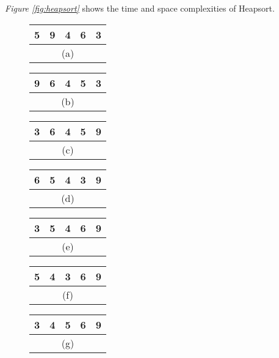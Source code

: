 \textit{Figure \ref{fig:heapsort}} shows the time and space complexities of Heapsort.

\begin{figure}[!ht]
    \centering
    \begin{tabular}{|c|c|c|c|c|}
    \hline
    5 & 9 & 4 & 6 & 3 \\
    \hline
    \multicolumn{5}{c}{(a)} \\
    \end{tabular}
    \quad\quad\quad
    \begin{tabular}{|c|c|c|c|c|}
    \hline
    9 & 6 & 4 & 5 & 3 \\
    \hline
    \multicolumn{5}{c}{(b)} \\
    \end{tabular}
    \break
    \begin{tabular}{|c|c|c|c|c|}
    \hline
    3 & 6 & 4 & 5 & \cellcolor{lightgray}9 \\
    \hline
    \multicolumn{5}{c}{(c)} \\
    \end{tabular}
    \quad\quad\quad
    \begin{tabular}{|c|c|c|c|c|}
    \hline
    6 & 5 & 4 & 3 & \cellcolor{lightgray}9 \\
    \hline
    \multicolumn{5}{c}{(d)} \\
    \end{tabular}
    \break
    \begin{tabular}{|c|c|c|c|c|}
    \hline
    3 & 5 & 4 & \cellcolor{lightgray}6 & \cellcolor{lightgray}9 \\
    \hline
    \multicolumn{5}{c}{(e)} \\
    \end{tabular}
    \quad\quad\quad
    \begin{tabular}{|c|c|c|c|c|}
    \hline
    5 & 4 & 3 & \cellcolor{lightgray}6 & \cellcolor{lightgray}9 \\
    \hline
    \multicolumn{5}{c}{(f)} \\
    \end{tabular}
    \break
    \begin{tabular}{|c|c|c|c|c|}
    \hline
    3 & 4 & \cellcolor{lightgray}5 & \cellcolor{lightgray}6 & \cellcolor{lightgray}9 \\
    \hline
    \multicolumn{5}{c}{(g)} \\
    \end{tabular}
    \quad\quad\quad
    \begin{tabular}{|c|c|c|c|c|}

\end{tabular}
\end{figure}
